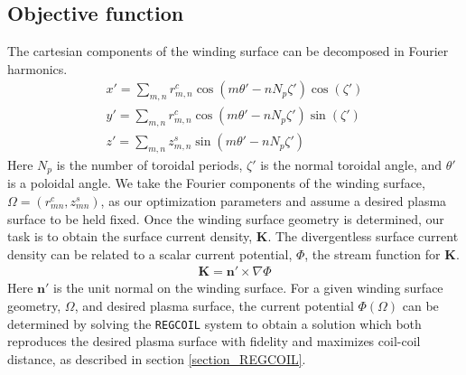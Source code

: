 \documentclass[aps,unsortedaddress]{revtex4-1}
\begin{document}
\subsection{Objective function}
The cartesian components of the winding surface can be decomposed in Fourier harmonics.
\begin{gather}
x' = \sum_{m,n} r_{m,n}^c \cos(m \theta' - n N_p \zeta') \cos (\zeta') \\
y' = \sum_{m,n} r_{m,n}^c \cos(m \theta' - n N_p \zeta') \sin (\zeta') \\
z' = \sum_{m,n} z_{m,n}^s \sin(m \theta' - n N_p \zeta') 
\label{Fourier}
\end{gather}
Here $N_p$ is the number of toroidal periods, $\zeta'$ is the normal toroidal angle, and $\theta'$ is a poloidal angle. We take the Fourier components of the winding surface, $\Omega = (r_{mn}^c, z_{mn}^s)$, as our optimization parameters and assume a desired plasma surface to be held fixed. Once the winding surface geometry is determined, our task is to obtain the surface current density, $\bm{K}$. The divergentless surface current density can be related to a scalar current potential, $\Phi$, the stream function for $\bm{K}$.
\begin{gather}
\bm{K} = \bm{n}' \times \nabla \Phi
\end{gather}
Here $\bm{n}'$ is the unit normal on the winding surface. For a given winding surface geometry, $\Omega$, and desired plasma surface, the current potential $\Phi (\Omega)$ can be determined by solving the \texttt{REGCOIL} system to obtain a solution which both reproduces the desired plasma surface with fidelity and maximizes coil-coil distance, as described in section \ref{section_REGCOIL}.
\end{document}
